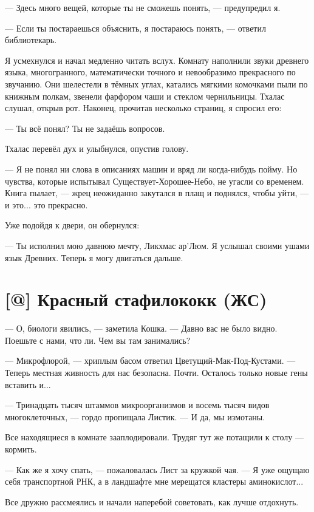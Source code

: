 --- Здесь много вещей, которые ты не сможешь понять, --- предупредил я.

--- Если ты постараешься объяснить, я постараюсь понять, --- ответил библиотекарь.

Я усмехнулся и начал медленно читать вслух.
Комнату наполнили звуки древнего языка, многогранного, математически точного и невообразимо прекрасного по звучанию.
Они шелестели в тёмных углах, катались мягкими комочками пыли по книжным полкам, звенели фарфором чаши и стеклом чернильницы.
Тхалас слушал, открыв рот.
Наконец, прочитав несколько страниц, я спросил его:

--- Ты всё понял?
Ты не задаёшь вопросов.

Тхалас перевёл дух и улыбнулся, опустив голову.

--- Я не понял ни слова в описаниях машин и вряд ли когда-нибудь пойму.
Но чувства, которые испытывал Существует-Хорошее-Небо, не угасли со временем.
Книга пылает, --- жрец неожиданно закутался в плащ и поднялся, чтобы уйти, --- и это... это прекрасно.

Уже подойдя к двери, он обернулся:

--- Ты исполнил мою давнюю мечту, Ликхмас ар’Люм.
Я услышал своими ушами язык Древних.
Теперь я могу двигаться дальше.

\section{[@] Красный стафилококк (ЖС)}

\textspace

--- О, биологи явились, --- заметила Кошка.
--- Давно вас не было видно.
Поешьте с нами, что ли.
Чем вы там занимались?

--- Микрофлорой, --- хриплым басом ответил Цветущий-Мак-Под-Кустами.
--- Теперь местная живность для нас безопасна.
Почти.
Осталось только новые гены вставить и...

--- Тринадцать тысяч штаммов микроорганизмов и восемь тысяч видов многоклеточных, --- гордо пропищала Листик.
--- И да, мы измотаны.

Все находящиеся в комнате зааплодировали.
Трудяг тут же потащили к столу --- кормить.

--- Как же я хочу спать, --- пожаловалась Лист за кружкой чая.
--- Я уже ощущаю себя транспортной РНК, а в ландшафте мне мерещатся кластеры аминокислот...

Все дружно рассмеялись и начали наперебой советовать, как лучше отдохнуть.

